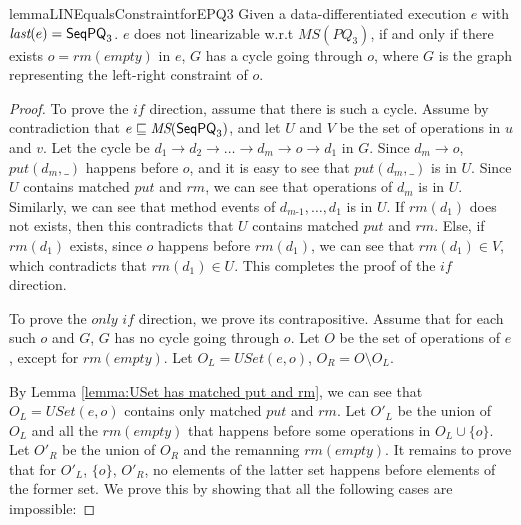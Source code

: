 \begin{restatable}{lemma}{LINEqualsConstraintforEPQ3}
\label{lemma:Lin Equals Constraint for EPQ3}
Given a data-differentiated execution $e$ with $\textit{last}(e) = \mathsf{SeqPQ}_3$. $e$ does not linearizable w.r.t $\textit{MS}(\textit{PQ}_3)$, if and only if there exists $o = \textit{rm}(\textit{empty})$ in $e$, $G$ has a cycle going through $o$, where $G$ is the graph representing the left-right constraint of $o$.
\end{restatable}

\begin {proof}

To prove the $\textit{if}$ direction, assume that there is such a cycle. Assume by contradiction that $e \sqsubseteq \textit{MS}(\mathsf{SeqPQ}_3)$, and let $U$ and $V$ be the set of operations in $u$ and $v$. Let the cycle be $d_1 \rightarrow d_2 \rightarrow \ldots \rightarrow d_m \rightarrow o \rightarrow d_1$ in $G$. Since $d_m \rightarrow o$, $\textit{put}(d_m,\_)$ happens before $o$, and it is easy to see that $\textit{put}(d_m,\_)$ is in $U$. Since $U$ contains matched $\textit{put}$ and $\textit{rm}$, we can see that operations of $d_m$ is in $U$. Similarly, we can see that method events of $d_{\textit{m-1}},\ldots,d_1$ is in $U$. If $\textit{rm}(d_1)$ does not exists, then this contradicts that $U$ contains matched $\textit{put}$ and $\textit{rm}$. Else, if $\textit{rm}(d_1)$ exists, since $o$ happens before $\textit{rm}(d_1)$, we can see that $\textit{rm}(d_1) \in V$, which contradicts that $\textit{rm}(d_1) \in U$. This completes the proof of the $\textit{if}$ direction.

To prove the $\textit{only if}$ direction, we prove its contrapositive. Assume that for each such $o$ and $G$, $G$ has no cycle going through $o$. Let $O$ be the set of operations of $e$, except for $\textit{rm}(\textit{empty})$. Let $O_L = \textit{USet}(e,o)$, $O_R = O \setminus O_L$.

By Lemma \ref{lemma:USet has matched put and rm}, we can see that $O_L = \textit{USet}(e,o)$ contains only matched $\textit{put}$ and $\textit{rm}$. Let $O'_L$ be the union of $O_L$ and all the $\textit{rm}(\textit{empty})$ that happens before some operations in $O_L \cup \{ o \}$. Let $O'_R$ be the union of $O_R$ and the remanning $\textit{rm}(\textit{empty})$. It remains to prove that for $O'_L$, $\{ o \}$, $O'_R$, no elements of the latter set happens before elements of the former set. We prove this by showing that all the following cases are impossible:


\end{proof}
